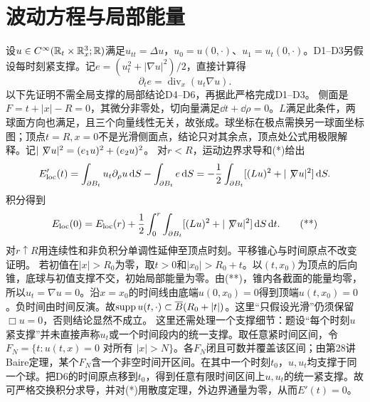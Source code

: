\documentclass[UTF8,fontset=fandol,11pt]{ctexart}
\begin{document}
\section{波动方程与局部能量}
设$u\in C^\infty(\mathbb R_t\times\mathbb R_x^3;\mathbb R)$满足$u_{tt}=\Delta u$，$u_0=u(0,\cdot)$、$u_1=u_t(0,\cdot)$。D1--D3另假设每时刻紧支撑。记$e=(u_t^2+|\nabla u|^2)/2$，直接计算得
\[\partial_te=\operatorname{div}_x(u_t\nabla u).\tag{*}\]
以下先证明不需全局支撑的局部结论D4--D6，再据此严格完成D1--D3。
侧面是$F=t+|x|-R=0$，其微分非零处，切向量满足$\dd t+\dd\rho=0$。$L$满足此条件，两球面方向也满足，且三个向量线性无关，故张成。球坐标在极点需换另一球面坐标图；顶点$t=R,x=0$不是光滑侧面点，结论只对其余点，顶点处公式用极限解释。记$|\not\!\nabla u|^2=(e_1u)^2+(e_2u)^2$。
对$r<R$，运动边界求导和(*)给出
\[E_{\rm loc}'(t)=\int_{\partial B_t}u_t\partial_\rho u\,\mathrm d S-\int_{\partial B_t}e\,\mathrm d S=-\frac12\int_{\partial B_t}[(Lu)^2+|\not\!\nabla u|^2]\,\mathrm d S.\]
积分得到
\[E_{\rm loc}(0)=E_{\rm loc}(r)+\frac12\int_0^r\int_{\partial B_t}[(Lu)^2+|\not\!\nabla u|^2]\,\mathrm d S\,\mathrm d t.\tag{**}\]
对$r\uparrow R$用连续性和非负积分单调性延伸至顶点时刻。平移锥心与时间原点不改变证明。
若初值在$|x|>R_0$为零，取$t>0$和$|x_0|>R_0+t$。以$(t,x_0)$为顶点的后向锥，底球与初值支撑不交，初始局部能量为零。由(**)，锥内各截面的能量均零，所以$u_t=\nabla u=0$。沿$x=x_0$的时间线由底端$u(0,x_0)=0$得到顶端$u(t,x_0)=0$。负时间由时间反演。故$\operatorname{supp} u(t,\cdot)\subset\overline B(R_0+|t|)$。这里“只假设光滑”仍须保留$\Box u=0$，否则结论显然不成立。
这里还需处理一个支撑细节：题设“每个时刻$u$紧支撑”并未直接声称$u_t$或一个时间段内的统一支撑。取任意紧时间区间，令$F_N=\{t:u(t,x)=0\text{ 对所有 }|x|>N\}$。各$F_N$闭且可数并覆盖该区间；由第28讲Baire定理，某个$F_N$含一个非空时间开区间。在其中一个时刻$t_0$，$u,u_t$均支撑于同一个球。把D6的时间原点移到$t_0$，得到任意有限时间区间上$u,u_t$的统一紧支撑。故可严格交换积分求导，并对(*)用散度定理，外边界通量为零，从而$E'(t)=0$。
\end{document}
